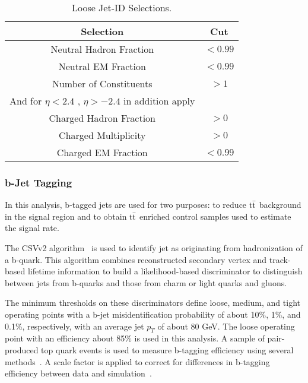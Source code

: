 \begin{table}[htbp!]
\begin{center}
 \caption{Loose Jet-ID Selections.\label{tab:jetId}}
 \begin{tabular}{|cc|}
 \hline\hline
       Selection                        & Cut        \\[0.5ex] \hline
       Neutral Hadron Fraction          & $<0.99$      \\
       Neutral EM Fraction              & $<0.99$      \\
       Number of Constituents           & $> 1$        \\
       And for $\eta < 2.4$ , $\eta > -2.4$ in addition apply &\\
       Charged Hadron Fraction 	        & $> 0$   \\
       Charged Multiplicity             & $> 0$   \\
       Charged EM Fraction              & $<0.99$ \\
 \hline
 \hline
 \end{tabular}
\end{center}
\end{table}

\subsubsection{b-Jet Tagging}

In this analysis, b-tagged jets are used for two purposes: to reduce $\rm{t\bar{t}}$ background in the signal region and to obtain $\rm{t\bar{t}}$ enriched 
control samples used to estimate the signal rate.

The CSVv2 algorithm~\cite{Chatrchyan:2012jua} is used to identify jet as originating from hadronization of a b-quark. This algorithm combines 
reconstructed secondary vertex and track-based lifetime information to build a likelihood-based discriminator to distinguish between jets from b-quarks and those 
from charm or light quarks and gluons.

The minimum thresholds on these discriminators define loose, medium, and tight operating points with a b-jet misidentification probability of about 10\%, 1\%, and 
0.1\%, respectively, with an average jet $p_T$ of about 80 GeV. The loose operating point with an efficiency about 85\% is used in this analysis.
A sample of pair-produced top quark events is used to measure b-tagging efficiency using several methods~\cite{CMS-PAS-BTV-13-001}. A scale factor is 
applied to correct for differences in b-tagging efficiency between data and simulation~\cite{bTagging}.
